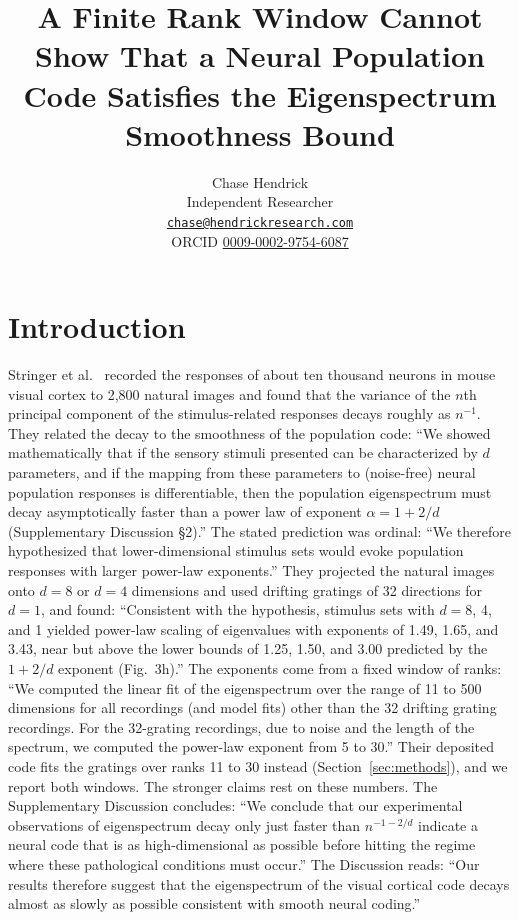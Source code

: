 \documentclass[11pt]{article}
\title{\Large\bfseries A Finite Rank Window Cannot Show That a Neural Population Code Satisfies the Eigenspectrum Smoothness Bound}
\author{Chase Hendrick\\[0.2em] {\small Independent Researcher}\\ {\small\href{mailto:chase@hendrickresearch.com}{\texttt{chase@hendrickresearch.com}}}\\ {\small ORCID \href{https://orcid.org/0009-0002-9754-6087}{0009-0002-9754-6087}}}
\date{}
\theoremstyle{definition}
\begin{document}
\maketitle

\begin{abstract}

\end{abstract}

\section{Introduction}\label{sec:intro}

Stringer et al.\ \cite{stringer2019} recorded the responses of about ten thousand neurons in mouse visual cortex to 2,800 natural images and found that the variance of the $n$th principal component of the stimulus-related responses decays roughly as $n^{-1}$. They related the decay to the smoothness of the population code: ``We showed mathematically that if the sensory stimuli presented can be characterized by $d$ parameters, and if the mapping from these parameters to (noise-free) neural population responses is differentiable, then the population eigenspectrum must decay asymptotically faster than a power law of exponent $\alpha = 1 + 2/d$ (Supplementary Discussion \S2).'' The stated prediction was ordinal: ``We therefore hypothesized that lower-dimensional stimulus sets would evoke population responses with larger power-law exponents.'' They projected the natural images onto $d = 8$ or $d = 4$ dimensions and used drifting gratings of 32 directions for $d = 1$, and found: ``Consistent with the hypothesis, stimulus sets with $d = 8$, 4, and 1 yielded power-law scaling of eigenvalues with exponents of 1.49, 1.65, and 3.43, near but above the lower bounds of 1.25, 1.50, and 3.00 predicted by the $1 + 2/d$ exponent (Fig.~3h).'' The exponents come from a fixed window of ranks: ``We computed the linear fit of the eigenspectrum over the range of 11 to 500 dimensions for all recordings (and model fits) other than the 32 drifting grating recordings. For the 32-grating recordings, due to noise and the length of the spectrum, we computed the power-law exponent from 5 to 30.'' Their deposited code fits the gratings over ranks 11 to 30 instead (Section~\ref{sec:methods}), and we report both windows. The stronger claims rest on these numbers. The Supplementary Discussion concludes: ``We conclude that our experimental observations of eigenspectrum decay only just faster than $n^{-1-2/d}$ indicate a neural code that is as high-dimensional as possible before hitting the regime where these pathological conditions must occur.'' The Discussion reads: ``Our results therefore suggest that the eigenspectrum of the visual cortical code decays almost as slowly as possible consistent with smooth neural coding.''
\end{document}
